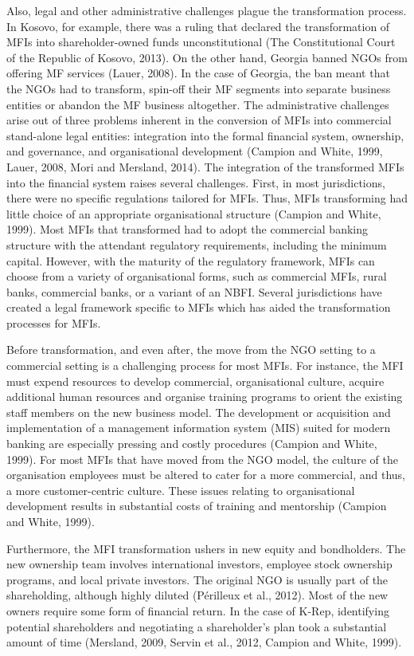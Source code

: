 \documentclass[a4paper, nobind]{templates/ociamthesis}
\begin{document}
Also, legal and other administrative challenges plague the transformation process. In Kosovo, for example, there was a ruling that declared the transformation of MFIs into shareholder-owned funds unconstitutional (The Constitutional Court of the Republic of Kosovo, 2013). On the other hand, Georgia banned NGOs from offering MF services (Lauer, 2008). In the case of Georgia, the ban meant that the NGOs had to transform, spin-off their MF segments into separate business entities or abandon the MF business altogether.
The administrative challenges arise out of three problems inherent in the conversion of MFIs into commercial stand-alone legal entities: integration into the formal financial system, ownership, and governance, and organisational development (Campion and White, 1999, Lauer, 2008, Mori and Mersland, 2014). The integration of the transformed MFIs into the financial system raises several challenges. First, in most jurisdictions, there were no specific regulations tailored for MFIs. Thus, MFIs transforming had little choice of an appropriate organisational structure (Campion and White, 1999). Most MFIs that transformed had to adopt the commercial banking structure with the attendant regulatory requirements, including the minimum capital. However, with the maturity of the regulatory framework, MFIs can choose from a variety of organisational forms, such as commercial MFIs, rural banks, commercial banks, or a variant of an NBFI. Several jurisdictions have created a legal framework specific to MFIs which has aided the transformation processes for MFIs.

Before transformation, and even after, the move from the NGO setting to a commercial setting is a challenging process for most MFIs. For instance, the MFI must expend resources to develop commercial, organisational culture, acquire additional human resources and organise training programs to orient the existing staff members on the new business model. The development or acquisition and implementation of a management information system (MIS) suited for modern banking are especially pressing and costly procedures (Campion and White, 1999). For most MFIs that have moved from the NGO model, the culture of the organisation employees must be altered to cater for a more commercial, and thus, a more customer-centric culture. These issues relating to organisational development results in substantial costs of training and mentorship (Campion and White, 1999).

Furthermore, the MFI transformation ushers in new equity and bondholders. The new ownership team involves international investors, employee stock ownership programs, and local private investors. The original NGO is usually part of the shareholding, although highly diluted (Périlleux et al., 2012). Most of the new owners require some form of financial return. In the case of K-Rep, identifying potential shareholders and negotiating a shareholder's plan took a substantial amount of time (Mersland, 2009, Servin et al., 2012, Campion and White, 1999).
\end{document}

